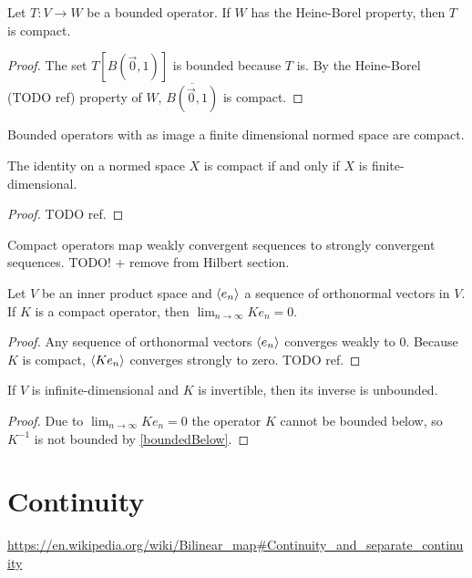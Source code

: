 \begin{lemma}
Let $T:V\to W$ be a bounded operator. If $W$ has the Heine-Borel property, then $T$ is compact.
\end{lemma}
\begin{proof}
The set $T[B(\vec{0},1)]$ is bounded because $T$ is. By the Heine-Borel (TODO ref) property of $W$, $\overline{B(\vec{0},1)}$ is compact.
\end{proof}
\begin{corollary}
Bounded operators with as image a finite dimensional normed space are compact.
\end{corollary}
\begin{corollary}
The identity on a normed space $X$ is compact \textup{if and only if} $X$ is finite-dimensional.
\end{corollary}
\begin{proof}
TODO ref. 
\end{proof}

\begin{proposition}
Compact operators map weakly convergent sequences to strongly convergent sequences. TODO! + remove from Hilbert section.
\end{proposition}
\begin{corollary} \label{limitCompactImageOrthonormalSequence}
Let $V$ be an inner product space and $\left\langle e_n \right\rangle$ a sequence of orthonormal vectors in $V$. If $K$ is a compact operator, then $\lim_{n\to\infty}Ke_n = 0$.
\end{corollary}
\begin{proof}
Any sequence of orthonormal vectors $\left\langle e_n \right\rangle$ converges weakly to $0$. Because $K$ is compact, $\left\langle Ke_n \right\rangle$ converges strongly to zero. TODO ref.
\end{proof}
\begin{corollary}
If $V$ is infinite-dimensional and $K$ is invertible, then its inverse is unbounded.
\end{corollary}
\begin{proof}
Due to $\lim_{n\to\infty}Ke_n = 0$ the operator $K$ cannot be bounded below, so $K^{-1}$ is not bounded by \ref{boundedBelow}.
\end{proof}

\chapter{Continuity}
\url{https://en.wikipedia.org/wiki/Bilinear_map#Continuity_and_separate_continuity}